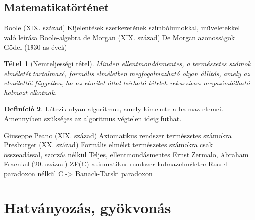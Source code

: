 \documentclass[twoside,12pt]{report}
\newtheorem{theorem}{Tétel}[section]
\theoremstyle{definition}
\newtheorem{definition}[theorem]{Definíció}
\begin{document}
\section{Matematikatörténet}
	\begin{outline}
		\1 Boole (XIX. század)
			\2 Kijelentések szerkezetének szimbólumokkal, műveletekkel való leírása
			\2 Boole-algebra
		\1 de Morgan (XIX. század)
			\2 De Morgan azonosságok
		\1 Gödel (1930-as évek)
			\2[]
			\begin{theorem}[Nemteljességi tétel]
				Minden ellentmondásmentes, a természetes számok elméletét tartalmazó, formális elméletben megfogalmazható olyan állítás, amely az elmélettől független, ha az elmélet által leírható tételek rekurzívan megszámlálható halmazt alkotnak.
			\end{theorem}
			\2[] 
			\begin{definition}
				Létezik olyan algoritmus, amely kimenete a halmaz elemei. Amennyiben szükséges az algoritmus végtelen ideig futhat.
			\end{definition}
		\1 Giuseppe Peano (XIX. század)
			\2 Axiomatikus rendszer természetes számokra
		\1 Presburger (XX. század)
			\2 Formális elmélet természetes számokra csak összeadással, szorzás nélkül
			\2 Teljes, ellentmondásmentes
		\1 Ernst Zermalo, Abraham Fraenkel (20. század)
			\2 ZF(C) axiomatikus rendszer halmazelméletre Russel paradoxon nélkül
			\2 C -> Banach-Tarski paradoxon
	\end{outline}
\chapter{Hatványozás, gyökvonás}
\end{document}
